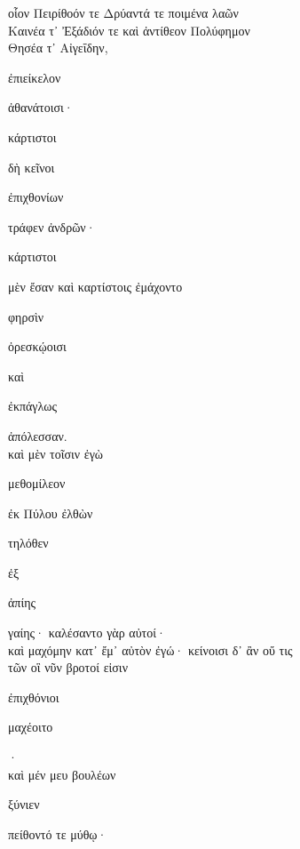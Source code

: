 \documentclass{ransom}
\begin{document}
\renewcommand{\rightheaderwhat}{\rightheaderwhatglosses}%
\begin{foreignpage}
\begin{graytext}
οἷον Πειρίθοόν τε Δρύαντά τε ποιμένα λαῶν\\
Καινέα τ᾽ Ἐξάδιόν τε καὶ ἀντίθεον Πολύφημον\\
Θησέα τ᾽ Αἰγεΐδην, \begin{whitetext}ἐπιείκελον\end{whitetext} ἀθανάτοισι·\hfill{}\\
\begin{whitetext}κάρτιστοι\end{whitetext} δὴ κεῖνοι \begin{whitetext}ἐπιχθονίων\end{whitetext} τράφεν ἀνδρῶν·\\
\begin{whitetext}κάρτιστοι\end{whitetext} μὲν ἔσαν καὶ καρτίστοις ἐμάχοντο\\
\begin{whitetext}φηρσὶν\end{whitetext} \begin{whitetext}ὀρεσκῴοισι\end{whitetext} καὶ \begin{whitetext}ἐκπάγλως\end{whitetext} ἀπόλεσσαν.\\
καὶ μὲν τοῖσιν ἐγὼ \begin{whitetext}μεθομίλεον\end{whitetext} ἐκ Πύλου ἐλθὼν\\
\begin{whitetext}τηλόθεν\end{whitetext} ἐξ \begin{whitetext}ἀπίης\end{whitetext} γαίης· καλέσαντο γὰρ αὐτοί·\hfill{}\\
καὶ μαχόμην κατ᾽ ἔμ᾽ αὐτὸν ἐγώ· κείνοισι δ᾽ ἂν οὔ τις\\
τῶν οἳ νῦν βροτοί εἰσιν \begin{whitetext}ἐπιχθόνιοι\end{whitetext} \begin{whitetext}μαχέοιτο\end{whitetext}·\\
καὶ μέν μευ βουλέων \begin{whitetext}ξύνιεν\end{whitetext} πείθοντό τε μύθῳ·\\

\end{graytext}
\end{foreignpage}
\end{document}
